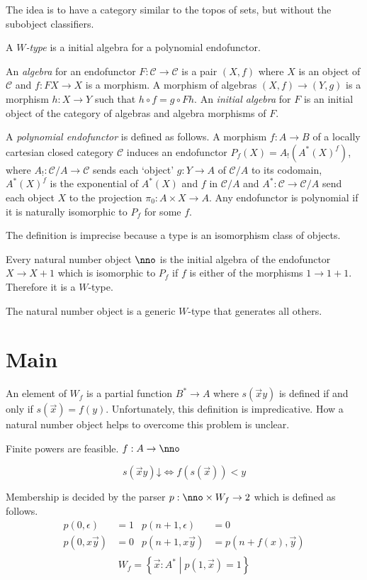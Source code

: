 \documentclass{tac}
\newcommand\cat\mathcal
\newcommand\set[1]{\left\{#1\right\}}
\newcommand\ri{^*}
\newcommand\of:
\begin{document}
The idea is to have a category similar to the topos of sets, but without the subobject classifiers.

\begin{definition} A \emph{$W$-type} is a initial algebra for a polynomial endofunctor. 

An \emph{algebra} for an endofunctor $F\of \cat C\to\cat C$ is a pair $(X,f)$ where $X$ is an object of $\cat C$ and $f\of FX\to X$ is a morphism. A morphism of algebras $(X,f)\to(Y,g)$ is a morphism $h\of X\to Y$ such that $h\circ f=g\circ Fh$. An \emph{initial algebra} for $F$ is an initial object of the category of algebras and algebra morphisms of $F$.

A \emph{polynomial endofunctor} is defined as follows. A morphism $f\of A\to B$ of a locally cartesian closed category $\cat C$ induces an endofunctor $P_f(X) = A_!(A\ri(X)^f)$, where $A_!\of \cat C/A\to \cat C$ sends each `object' $g\of Y\to A$ of $\cat C/A$ to its codomain, $A\ri(X)^f$ is the exponential of $A\ri(X)$ and $f$ in $\cat C/A$ and $A\ri\of \cat C\to\cat C/A$ send each object $X$ to the projection $\pi_0\of A\times X\to A$. Any endofunctor is polynomial if it is naturally isomorphic to $P_f$ for some $f$.
\end{definition}

The definition is imprecise because a type is an isomorphism class of objects.

\begin{example} Every natural number object $\nno$ is the initial algebra of the endofunctor $X\to X+1$ which is isomorphic to $P_f$ if $f$ is either of the morphisms $1\to 1+1$. Therefore it is a $W$-type.
\end{example}

The natural number object is a generic $W$-type that generates all others.

\section{Main}%

An element of $W_f$ is a partial function $B^*\to A$ where $s(\vec x y)$ is defined if and only if $s(\vec x)=f(y)$. Unfortunately, this definition is impredicative. How a natural number object helps to overcome this problem is unclear.

Finite powers are feasible.
$f\of A\to \nno$

\[ s(\vec xy)\mathord\downarrow \iff f(s(\vec x))<y \]

Membership is decided by the parser $p\of \nno\times W_f \to 2$ which is defined as follows. 
\begin{align*}
p(0,\epsilon) &= 1 & p(n+1,\epsilon) &= 0\\
p(0,x\vec y) &= 0 & p(n+1,x\vec y) &= p(n+f(x),\vec y)\\
\end{align*}
\[ W_f=\set{\vec x\of A^*\middle| p(1,\vec x)=1} \]
\end{document}
